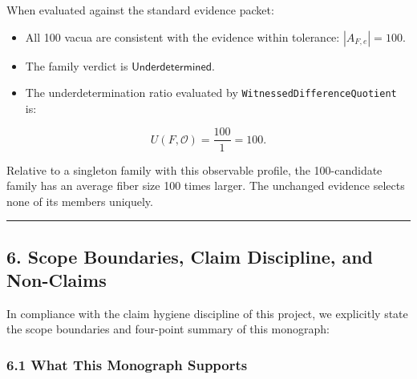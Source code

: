 \documentclass[
  10pt,
]{article}
\begin{document}
When evaluated against the standard evidence packet:

\begin{itemize}
\item
  All 100 vacua are consistent with the evidence within tolerance: \hypertarget{math-E0222-0338}{}{\(|A_{F,e}| = 100\)}.
\item
  The family verdict is \hypertarget{math-E0168-0339}{}{\(\mathsf{Underdetermined}\)}.
\item
  The underdetermination ratio evaluated by \texttt{WitnessedDifferenceQuotient} is:
\end{itemize}

\hypertarget{math-E0223-0340}{}{\[U(F, \mathcal{O}) = \frac{100}{1} = 100.\]}

Relative to a singleton family with this observable profile, the 100-candidate family has an average fiber size 100 times larger. The unchanged evidence selects none of its members uniquely.

\begin{center}\rule{0.5\linewidth}{0.5pt}\end{center}

\subsection{6. Scope Boundaries, Claim Discipline, and Non-Claims}\label{scope-boundaries-claim-discipline-and-non-claims}

In compliance with the claim hygiene discipline of this project, we explicitly state the scope boundaries and four-point summary of this monograph:

\subsubsection{6.1 What This Monograph Supports}\label{what-this-monograph-supports}
\end{document}
